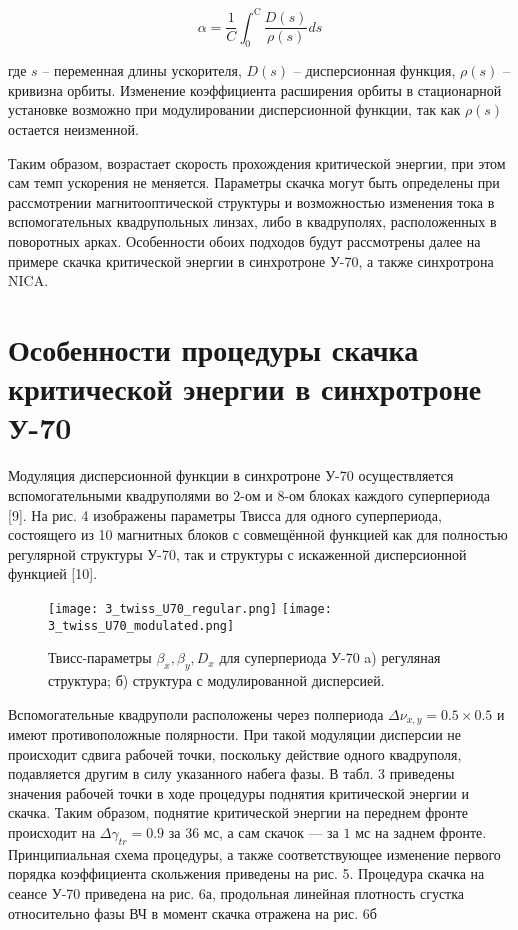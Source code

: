 \begin{equation}
\alpha=\frac{1}{C} \int_0^{\mathrm{C}} \frac{D(s)}{\rho(s)} d s
\label{eq:alpha_general}
\end{equation}

\noindent где $s$ -- переменная длины ускорителя, $D\left(s\right)$ -- дисперсионная функция, $\rho\left(s\right)$ -- кривизна орбиты. Изменение коэффициента расширения орбиты в стационарной установке возможно при модулировании дисперсионной функции, так как $\rho\left(s\right)$ остается неизменной. 

\par Таким образом, возрастает скорость прохождения критической энергии, при этом сам темп ускорения не меняется. Параметры скачка могут быть определены при рассмотрении магнитооптической структуры и возможностью изменения тока в вспомогательных квадрупольных линзах, либо в квадруполях, расположенных в поворотных арках. Особенности обоих подходов будут рассмотрены далее на примере скачка критической энергии в синхротроне У-70, а также синхротрона NICA.

\section{Особенности процедуры скачка критической энергии в синхротроне У-70}

\par Модуляция дисперсионной функции в синхротроне У-70 осуществляется вспомогательными квадруполями во $2$-ом и $8$-ом блоках каждого суперпериода [9]. На рис. 4 изображены параметры Твисса для одного суперпериода, состоящего из 10 магнитных блоков с совмещённой функцией как для полностью регулярной структуры У-70, так и структуры с искаженной дисперсионной функцией [10].

\begin{figure} [h!]
   \texttt{[image: 3\_twiss\_U70\_regular.png]}
   \texttt{[image: 3\_twiss\_U70\_modulated.png]}
   \caption{Твисс-параметры $\beta_x,\beta_y, D_x$ для суперпериода У-70 a) регуляная структура; б) структура с модулированной дисперсией.}
   \label{fig:3_twiss_U70}
\end{figure}

\par Вспомогательные квадруполи расположены через полпериода $\Delta\nu_{x,y}=0.5\times0.5$ и имеют противоположные полярности. При такой модуляции дисперсии не происходит сдвига рабочей точки, поскольку действие одного квадруполя, подавляется другим в силу указанного набега фазы. В табл. 3 приведены значения рабочей точки в ходе процедуры поднятия критической энергии и скачка. Таким образом, поднятие критической энергии на переднем фронте происходит на $\Delta \gamma_{tr}=0.9$ за $36$ мс, а сам скачок — за $1$ мс на заднем фронте. Принципиальная схема процедуры, а также соответствующее изменение первого порядка коэффициента скольжения приведены на рис. 5. Процедура скачка на сеансе У-70 приведена на рис. 6а, продольная линейная плотность сгустка относительно фазы ВЧ в момент скачка отражена на рис. 6б

